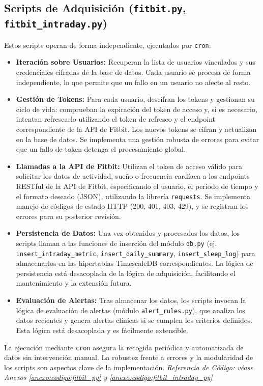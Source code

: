 \subsection{Scripts de Adquisición (\texttt{fitbit.py}, \texttt{fitbit\_intraday.py})}
Estos scripts operan de forma independiente, ejecutados por \texttt{cron}:
\begin{itemize}
    \item \textbf{Iteración sobre Usuarios:} Recuperan la lista de usuarios vinculados y sus credenciales cifradas de la base de datos. Cada usuario se procesa de forma independiente, lo que permite que un fallo en un usuario no afecte al resto.
    \item \textbf{Gestión de Tokens:} Para cada usuario, descifran los tokens y gestionan su ciclo de vida: comprueban la expiración del token de acceso y, si es necesario, intentan refrescarlo utilizando el token de refresco y el endpoint correspondiente de la API de Fitbit. Los nuevos tokens se cifran y actualizan en la base de datos. Se implementa una gestión robusta de errores para evitar que un fallo de token detenga el procesamiento global.
    \item \textbf{Llamadas a la API de Fitbit:} Utilizan el token de acceso válido para solicitar los datos de actividad, sueño o frecuencia cardíaca a los endpoints RESTful de la API de Fitbit, especificando el usuario, el periodo de tiempo y el formato deseado (JSON), utilizando la librería \texttt{requests}. Se implementa manejo de códigos de estado HTTP (200, 401, 403, 429), y se registran los errores para su posterior revisión.
    \item \textbf{Persistencia de Datos:} Una vez obtenidos y procesados los datos, los scripts llaman a las funciones de inserción del módulo \texttt{db.py} (ej. \texttt{insert\_intraday\_metric}, \texttt{insert\_daily\_summary}, \texttt{insert\_sleep\_log}) para almacenarlos en las hipertablas TimescaleDB correspondientes. La lógica de persistencia está desacoplada de la lógica de adquisición, facilitando el mantenimiento y la extensión futura.
    \item \textbf{Evaluación de Alertas:} Tras almacenar los datos, los scripts invocan la lógica de evaluación de alertas (módulo \texttt{alert\_rules.py}), que analiza los datos recientes y genera alertas clínicas si se cumplen los criterios definidos. Esta lógica está desacoplada y es fácilmente extensible.
\end{itemize}
La ejecución mediante \texttt{cron} asegura la recogida periódica y automatizada de datos sin intervención manual. La robustez frente a errores y la modularidad de los scripts son aspectos clave de la implementación.
\noindent\textit{Referencia de Código: véase Anexos \ref{anexo:codigo:fitbit_py} y \ref{anexo:codigo:fitbit_intraday_py}}
